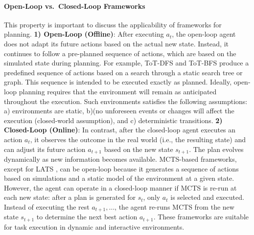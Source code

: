 \paragraph{Open-Loop vs.\ Closed-Loop Frameworks}
This property is important to discuss the applicability of frameworks for planning.
\textbf{1) Open-Loop (Offline)}: After executing $a_t$, the open-loop agent does not adapt its future actions based on the actual new state. Instead, it continues to follow a pre-planned sequence of actions, which are based on the simulated state during planning.
For example,
ToT-DFS and ToT-BFS \citep{yao2023tree} produce a predefined sequence of actions based on a search through a static search tree or graph. This sequence is intended to be executed exactly as planned.
Ideally, open-loop planning requires that the environment will remain as anticipated throughout the execution. Such environments satisfies the following assumptions: 
a) environments are static, 
b)(no unforeseen events or changes will affect the execution (closed-world assumption), and 
c) deterministic transitions.
\textbf{2) Closed-Loop (Online)}:
In contrast, after the closed-loop agent executes an action $a_t$, it observes the outcome in the real world (i.e., the resulting state) and can adjust its future action $a_{t+1}$ based on the new state $s_{t+1}$. The plan evolves dynamically as new information becomes available.
MCTS-based frameworks, except for LATS \citep{zhou2024language}, can be open-loop because it generates a sequence of actions based on simulations and a static model of the environment at a given state. 
However, the agent can operate in a closed-loop manner if MCTS is re-run at each new state:
after a plan is generated for $s_t$, only $a_t$ is selected and executed. Instead of executing the rest $a_{t+1}, \ldots$, the agent re-runs MCTS from the new state $s_{t+1}$ to determine the next best action $a_{t+1}$.
These frameworks are suitable for task execution in dynamic and interactive environments.

\paragraph{}

